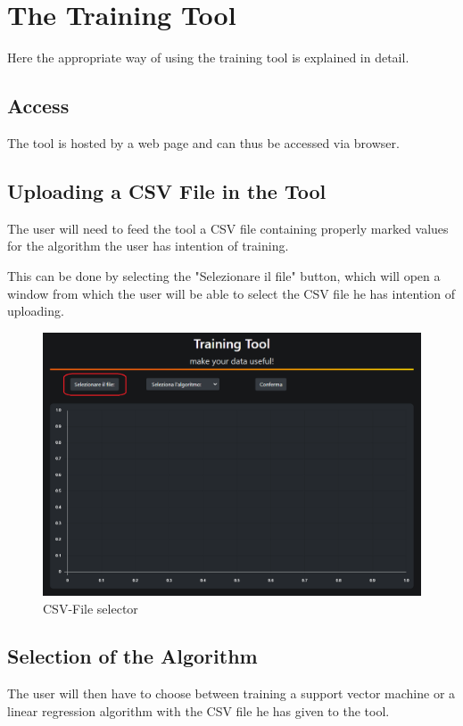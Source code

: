 \section{The Training Tool}
Here the appropriate way of using the training tool is explained in detail.

\subsection{Access}
The tool is hosted by a web page and can thus be accessed via browser.

\subsection{Uploading a CSV File in the Tool}
The user will need to feed the tool a CSV file containing properly marked values for the algorithm the user has intention of training.

This can be done by selecting the "Selezionare il file" button, which will open a window from which the user will be able to select the CSV file he has intention of uploading.

\begin{figure}[H]
\centering
\includegraphics[scale=0.65]{img/tool/pointer_tool_1.png}
\caption{CSV-File selector}
\end{figure}
\newpage

\subsection{Selection of the Algorithm}
The user will then have to choose between training a support vector machine or a linear regression algorithm with the CSV file he has given to the tool.

